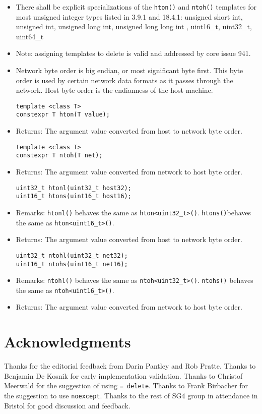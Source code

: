\documentclass[12pt,twoside]{article}
\begin{document}
\begin{itemize}
    \item There shall be explicit specializations of the \texttt{hton()} and \texttt{ntoh()} templates for most unsigned integer types listed in 3.9.1 and 18.4.1: unsigned short int, unsigned int, unsigned long int, unsigned long long int
, uint16\_t, uint32\_t, uint64\_t
    \item  Note: assigning templates to delete is valid and addressed by core issue 941.
    \item Network byte order is big endian, or most significant byte first. This byte order is used by certain network data formats as it passes through the network. Host byte order is the endianness of the host machine.


\begin{lstlisting}
template <class T>
constexpr T hton(T value);
\end{lstlisting}
    \item Returns: The argument value converted from host to network byte order.


\begin{lstlisting}
template <class T>
constexpr T ntoh(T net);
\end{lstlisting}
    \item Returns: The argument value converted from network to host byte order.


\begin{lstlisting}
uint32_t htonl(uint32_t host32);
uint16_t htons(uint16_t host16);
\end{lstlisting}
    \item Remarks:  \texttt{htonl()} behaves the same as \texttt{hton<uint32\_t>()}.  \texttt{htons()}behaves the same as \texttt{hton<uint16\_t>()}.
    \item Returns: The argument value converted from host to network byte order.


\begin{lstlisting}
uint32_t ntohl(uint32_t net32);
uint16_t ntohs(uint16_t net16);
\end{lstlisting}
    \item Remarks: \texttt{ntohl()} behaves the same as \texttt{ntoh<uint32\_t>()}.  \texttt{ntohs()}
behaves the same as  \texttt{ntoh<uint16\_t>()}.
    \item Returns: The argument value converted from network to host byte order.
\end{itemize}

\section{Acknowledgments}
Thanks for the editorial feedback from Darin Pantley and Rob Pratte. Thanks to Benjamin De Kosnik for early implementation validation. Thanks to Christof Meerwald for the suggestion of using \texttt{= delete}. Thanks to Frank Birbacher for the suggestion to use \texttt{noexcept}. Thanks to the rest of SG4 group in attendance in Bristol for good discussion and feedback.
\end{document}
